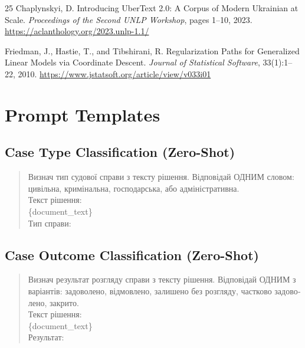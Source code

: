 \documentclass[11pt,a4paper]{article}
\begin{document}
\begin{thebibliography}{25}
Chaplynskyi, D.
\newblock Introducing UberText 2.0: A Corpus of Modern Ukrainian at Scale.
\newblock \emph{Proceedings of the Second UNLP Workshop}, pages 1--10, 2023.
\newblock \url{https://aclanthology.org/2023.unlp-1.1/}

Friedman, J., Hastie, T., and Tibshirani, R.
\newblock Regularization Paths for Generalized Linear Models via Coordinate Descent.
\newblock \emph{Journal of Statistical Software}, 33(1):1--22, 2010.
\newblock \url{https://www.jstatsoft.org/article/view/v033i01}

\end{thebibliography}

\appendix

\section{Prompt Templates}
\label{app:prompts}

\subsection{Case Type Classification (Zero-Shot)}

\begin{quote}\small\ttfamily
\foreignlanguage{ukrainian}{Визнач тип судової справи з тексту рішення.
Відповідай ОДНИМ словом: цивільна, кримінальна,
господарська, або адміністративна.}\\[6pt]
\foreignlanguage{ukrainian}{Текст рішення:}\\
\{document\_text\}\\[6pt]
\foreignlanguage{ukrainian}{Тип справи:}
\end{quote}

\subsection{Case Outcome Classification (Zero-Shot)}

\begin{quote}\small\ttfamily
\foreignlanguage{ukrainian}{Визнач результат розгляду справи з тексту рішення.
Відповідай ОДНИМ з варіантів: задоволено, відмовлено,
залишено без розгляду, частково задоволено, закрито.}\\[6pt]
\foreignlanguage{ukrainian}{Текст рішення:}\\
\{document\_text\}\\[6pt]
\foreignlanguage{ukrainian}{Результат:}
\end{quote}
\end{document}
